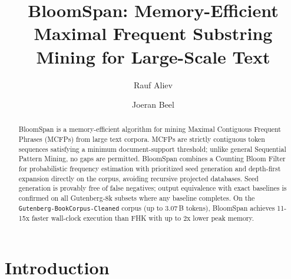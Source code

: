 \documentclass[runningheads]{llncs}
\begin{document}
    \title{BloomSpan: Memory-Efficient Maximal Frequent Substring Mining for Large-Scale Text}


    \author{Rauf Aliev \and
    Joeran Beel}



    \maketitle

    \begin{abstract}
        BloomSpan is a memory-efficient algorithm for mining Maximal Contiguous Frequent Phrases (MCFPs) from large text corpora. MCFPs are strictly contiguous token sequences satisfying a minimum document-support threshold; unlike general Sequential Pattern Mining, no gaps are permitted. BloomSpan combines a Counting Bloom Filter for probabilistic frequency estimation with prioritized seed generation and depth-first expansion directly on the corpus, avoiding recursive projected databases. Seed generation is provably free of false negatives; output equivalence with exact baselines is confirmed on all Gutenberg-8k subsets where any baseline completes. On the \texttt{Gutenberg-BookCorpus-Cleaned} corpus (up to 3.07\,B tokens), BloomSpan achieves 11-15x faster wall-clock execution than FHK with up to 2x lower peak memory.
    \end{abstract}

    \section{Introduction}
\end{document}
